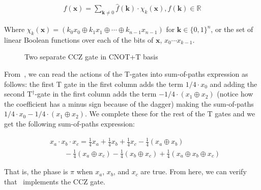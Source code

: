 \begin{equation}
  \begin{aligned}
    \label{eq-boolean-fourier}
    f(\mathbf{x}) = \sum_{\mathbf{k} \neq 0} \hat{f}(\mathbf{k}) \cdot \chi_k(\mathbf{x}),
    \hat{f}(\mathbf{k}) \in \mathbb{R}
  \end{aligned}
\end{equation}

Where $\chi_k(\mathbf{x}) = ( k_0 x_0 \oplus k_1 x_1 \oplus \cdots \oplus k_{n-1} x_{n-1})$
for $\mathbf{k} \in \{0,1\}^{n}$, or the set of linear Boolean functions over each of the bits
of $\mathbf{x}$, $x_0 \cdots x_{k-1}$.


\begin{figure}[t]
  \centering
  \begin{minipage}{\linewidth}
    \centering
    \scalebox{0.7} {
      
    }
    \label{fig-cnot-t-ccz}
  \end{minipage}
  \begin{minipage}{\linewidth}
    \centering
    \scalebox{0.7} {
      
    }
    \label{fig-alt-cnot-t-ccz}
  \end{minipage}
  \caption{Two separate CCZ gate in CNOT+T basis}
\end{figure}

From~, we can read the actions of the T-gates into sum-of-paths expression as follows: the
first T gate in the first column adds the term $1/4 \cdot x_0$ and adding the second T$^{\dagger}$-gate in the
first column adds the term $-1/4 \cdot (x_1 \oplus x_2)$ (notice how the coefficient has a minus sign because of
the dagger) making the sum-of-paths $1/4 \cdot x_0 -1/4 \cdot (x_1 \oplus x_2)$. We complete these for the
rest of the T gates and we get the following sum-of-paths expression:

\begin{equation}
  \label{eq-toff-bool}
  \begin{aligned}
    &x_a \cdot x_b \cdot x_c = \frac{1}{4}x_a + \frac{1}{4}x_b + \frac{1}{4}x_c - \frac{1}{4}(x_a \oplus x_b) \\
    &\qquad -\frac{1}{4}(x_a \oplus x_c) - \frac{1}{4}(x_b \oplus x_c) + \frac{1}{4}(x_a \oplus x_b \oplus x_c)
  \end{aligned}
\end{equation}

That is, the phase is $\pi$ when $x_a$, $x_b$, and $x_c$ are true. From here, we can verify
that~ implements the CCZ gate.

